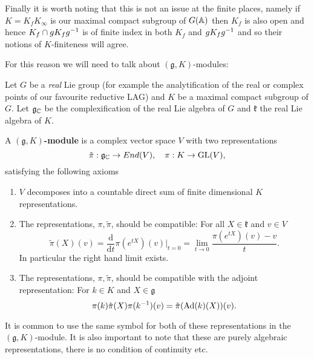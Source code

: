 \begin{example}
    Finally it is worth noting that this is not an issue at the finite places, namely if \(K = K_fK_\infty\) is our maximal compact subgroup of \(G(\A)\) then \(K_f\) is also open and hence \(K_f \cap gK_f g^{-1}\) is of finite index in both \(K_f\) and \(gK_f g^{-1}\) and so their notions of \(K\)-finiteness will agree. 
\end{example}

For this reason we will need to talk about \((\mathfrak{g}, K)\)-modules:

\begin{definition}
    Let \(G\) be a \textit{real} Lie group (for example the analytification of the real or complex points of our favourite reductive LAG) and \(K\) be a maximal compact subgroup of \(G\). Let \(\mathfrak{g}_\C\) be the complexification of the real Lie algebra of \(G\) and \(\mathfrak{k}\) the real Lie algebra of \(K\). 
    
    A \textbf{\((\mathfrak{g}, K)\)-module} is a complex vector space \(V\) with two representations 
    \[\tilde{\pi}: \mathfrak{g}_\C \to End(V), \quad \pi: K\to \GL(V),\]
    satisfying the following axioms
    \begin{enumerate}
        \item \(V\) decomposes into a countable direct sum of finite dimensional \(K\) representations.
        \item The representations, \(\pi, \tilde{\pi}\), should be compatible: For all \(X \in \mathfrak{k}\) and \(v\in V\)
        \[\tilde{\pi}(X)(v) = \frac{\mathrm{d}}{\mathrm{d}t}\pi(e^{tX})(v)|_{t=0} = \lim_{t\to 0}\frac{\pi(e^{tX})(v) - v}{t}.\]
        In particular the right hand limit exists.
        \item  The representations, \(\pi, \tilde{\pi}\), should be compatible with the adjoint representation: For \(k\in K\) and \(X\in \mathfrak{g}\) 
         \[\pi(k)\tilde{\pi}(X) \pi(k^{-1} )(v) = \tilde{\pi}(\mathrm{Ad}(k)(X))(v).\]
    \end{enumerate}
\end{definition}

\begin{remark}
    It is common to use the same symbol for both of these representations in the \((\mathfrak{g}, K)\)-module. It is also important to note that these are purely algebraic representations, there is no condition of continuity etc. 
\end{remark}

